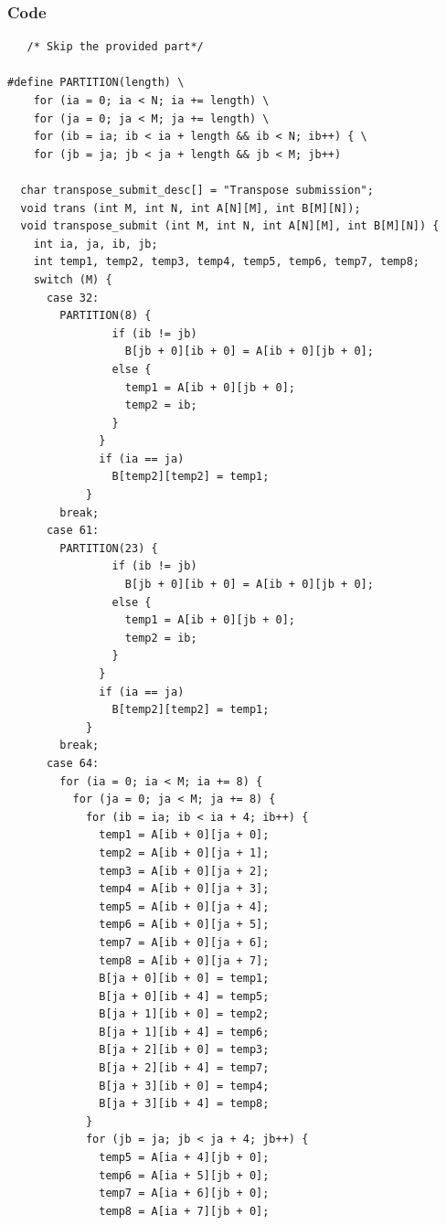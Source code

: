 \documentclass{article}
\begin{document}
\subsubsection{Code}

\begin{lstlisting}
   /* Skip the provided part*/

#define PARTITION(length) \
    for (ia = 0; ia < N; ia += length) \
    for (ja = 0; ja < M; ja += length) \
    for (ib = ia; ib < ia + length && ib < N; ib++) { \
    for (jb = ja; jb < ja + length && jb < M; jb++)
  
  char transpose_submit_desc[] = "Transpose submission";
  void trans (int M, int N, int A[N][M], int B[M][N]);
  void transpose_submit (int M, int N, int A[N][M], int B[M][N]) {
    int ia, ja, ib, jb;
    int temp1, temp2, temp3, temp4, temp5, temp6, temp7, temp8;
    switch (M) {
      case 32:
        PARTITION(8) {
                if (ib != jb)
                  B[jb + 0][ib + 0] = A[ib + 0][jb + 0];
                else {
                  temp1 = A[ib + 0][jb + 0];
                  temp2 = ib;
                }
              }
              if (ia == ja)
                B[temp2][temp2] = temp1;
            }
        break;
      case 61:
        PARTITION(23) {
                if (ib != jb)
                  B[jb + 0][ib + 0] = A[ib + 0][jb + 0];
                else {
                  temp1 = A[ib + 0][jb + 0];
                  temp2 = ib;
                }
              }
              if (ia == ja)
                B[temp2][temp2] = temp1;
            }
        break;
      case 64:
        for (ia = 0; ia < M; ia += 8) {
          for (ja = 0; ja < M; ja += 8) {
            for (ib = ia; ib < ia + 4; ib++) {
              temp1 = A[ib + 0][ja + 0];
              temp2 = A[ib + 0][ja + 1];
              temp3 = A[ib + 0][ja + 2];
              temp4 = A[ib + 0][ja + 3];
              temp5 = A[ib + 0][ja + 4];
              temp6 = A[ib + 0][ja + 5];
              temp7 = A[ib + 0][ja + 6];
              temp8 = A[ib + 0][ja + 7];
              B[ja + 0][ib + 0] = temp1;
              B[ja + 0][ib + 4] = temp5;
              B[ja + 1][ib + 0] = temp2;
              B[ja + 1][ib + 4] = temp6;
              B[ja + 2][ib + 0] = temp3;
              B[ja + 2][ib + 4] = temp7;
              B[ja + 3][ib + 0] = temp4;
              B[ja + 3][ib + 4] = temp8;
            }
            for (jb = ja; jb < ja + 4; jb++) {
              temp5 = A[ia + 4][jb + 0];
              temp6 = A[ia + 5][jb + 0];
              temp7 = A[ia + 6][jb + 0];
              temp8 = A[ia + 7][jb + 0];

\end{lstlisting}
\end{document}
